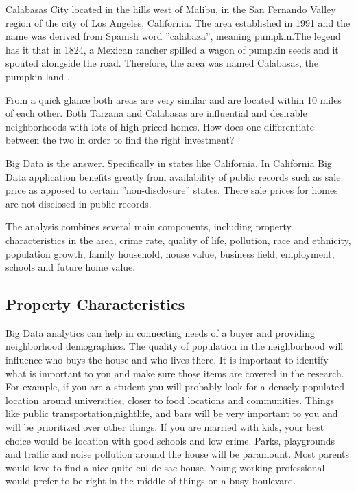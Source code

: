 \documentclass[sigconf]{acmart}
\begin{document}
Calabasas City located in the hills west of Malibu, in the San Fernando Valley region of the city of Los Angeles, California. The area established in 1991 and the name was derived from Spanish word ''calabaza'', meaning pumpkin.The legend has it that in 1824, a Mexican rancher spilled a wagon of pumpkin seeds and it spouted alongside the road. Therefore, the area was named Calabasas, the pumpkin land \cite{wiki}.

From a quick glance both areas are very similar and are located within 10 miles of each other. Both Tarzana and Calabasas are influential and desirable neighborhoods with lots of high priced homes. How does one differentiate between the two in order to find the right investment?

Big Data is the answer. Specifically in states like California.  In California Big Data application benefits greatly from availability of public records such as sale price as apposed to certain ''non-disclosure'' states. There sale prices for homes are not disclosed in public records.

The analysis combines several main components, including property characteristics in the area, crime rate, quality of life, pollution, race and ethnicity, population growth, family household, house value, business field, employment, schools and future home value.

\subsection{Property Characteristics}

Big Data analytics can help in connecting needs of a buyer and providing neighborhood demographics. The quality of population in the neighborhood will influence who buys the house and who lives there. It is important to identify what is important to you and make sure those items are covered in the research.  For example, if you are a student you will probably look for a densely populated location around universities, closer to food locations and communities. Things like public transportation,nightlife, and bars will be very important to you and will be prioritized over other things. If you are married with kids, your best choice would be location with good schools and low crime. Parks, playgrounds and traffic and noise pollution around the house will be paramount. Most parents would love to find a nice quite cul-de-sac house. Young working professional would prefer to be right in the middle of things on a busy boulevard.  
\end{document}
